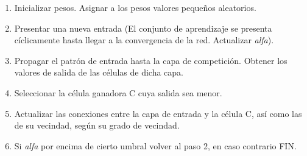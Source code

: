\documentclass[a4paper,11pt]{article}
\begin{document}
\begin{enumerate}

   \item Inicializar pesos. Asignar a los pesos valores pequeños aleatorios.

   \item Presentar una nueva entrada (El conjunto de  aprendizaje  se  presenta
     cíclicamente hasta llegar a la convergencia de la red. Actualizar \textit{alfa}).

   \item Propagar el patrón de entrada hasta la capa  de  competición.  Obtener
      los valores de salida de las células de dicha capa.

   \item Seleccionar la célula ganadora C cuya salida sea menor.

   \item Actualizar las conexiones entre la capa de entrada y la célula C,  así
      como las de su vecindad, según su grado de vecindad.

   \item Si \textit{alfa} por encima de cierto umbral volver al paso 2, en  caso  contrario
      FIN.

\end{enumerate}
\end{document}
